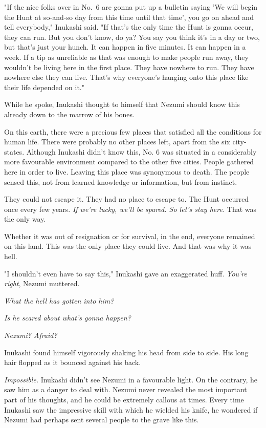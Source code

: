 "If the nice folks over in No.~6 are gonna put up a bulletin saying 'We
will begin the Hunt at so-and-so day from this time until that time',
you go on ahead and tell everybody," Inukashi said. "If that's the only
time the Hunt is gonna occur, they can run. But you don't know, do ya?
You say you think it's in a day or two, but that's just your hunch. It
can happen in five minutes. It can happen in a week. If a tip as
unreliable as that was enough to make people run away, they wouldn't be
living here in the first place. They have nowhere to run. They have
nowhere else they can live. That's why everyone's hanging onto this
place like their life depended on it."

While he spoke, Inukashi thought to himself that Nezumi should know this
already down to the marrow of his bones.

On this earth, there were a precious few places that satisfied all the
conditions for human life. There were probably no other places left,
apart from the six city-states. Although Inukashi didn't know this, No.
6 was situated in a considerably more favourable environment compared to
the other five cities. People gathered here in order to live. Leaving
this place was synonymous to death. The people sensed this, not from
learned knowledge or information, but from instinct.

They could not escape it. They had no place to escape to. The Hunt
occurred once every few years. \emph{If we're lucky, we'll be spared. So let's
stay here.} That was the only way.

Whether it was out of resignation or for survival, in the end, everyone
remained on this land. This was the only place they could live. And that
was why it was hell.

"I shouldn't even have to say this," Inukashi gave an exaggerated huff.
\emph{You're right}, Nezumi muttered.

\emph{What the hell has gotten into him?}

\emph{Is he scared about what's gonna happen?}

\emph{Nezumi? Afraid?}

Inukashi found himself vigorously shaking his head from side to side.
His long hair flopped as it bounced against his back.

\emph{Impossible.} Inukashi didn't see Nezumi in a favourable light. On the
contrary, he saw him as a danger to deal with. Nezumi never revealed the
most important part of his thoughts, and he could be extremely callous
at times. Every time Inukashi saw the impressive skill with which he
wielded his knife, he wondered if Nezumi had perhaps sent several people
to the grave like this.

